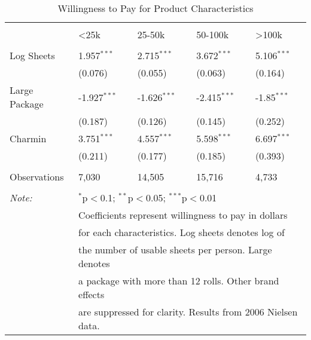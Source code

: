\begin{table}[!htbp] \centering
  \caption{Willingness to Pay for Product Characteristics}
  \label{tab:mlogit2006}
\begin{tabular}{lllll}
\\[-1.8ex]\hline
\hline \\[-1.8ex]
              & \textless{}25k & 25-50k    & 50-100k   & \textgreater{}100k \\
\hline \\[-1.8ex]
Log Sheets    & 1.957$^{***}$       & 2.715$^{***}$  & 3.672$^{***}$  & 5.106$^{***}$           \\
              & (0.076)        & (0.055)   & (0.063)   & (0.164)            \\
Large Package & -1.927$^{***}$      & -1.626$^{***}$ & -2.415$^{***}$ & -1.85$^{***}$           \\
              & (0.187)        & (0.126)   & (0.145)   & (0.252)            \\
Charmin       & 3.751$^{***}$       & 4.557$^{***}$  & 5.598$^{***}$  & 6.697$^{***}$           \\
              & (0.211)        & (0.177)   & (0.185)   & (0.393)            \\
 \hline \\[-1.8ex]
Observations  & 7,030          & 14,505    & 15,716    & 4,733 \\
\hline
\hline \\[-1.8ex]
\textit{Note:}  & \multicolumn{4}{l}{$^{*}$p$<$0.1; $^{**}$p$<$0.05; $^{***}$p$<$0.01} \\
 & \multicolumn{4}{l}{Coefficients represent willingness to pay in dollars}
 \\
 & \multicolumn{4}{l}{for each characteristics. Log sheets denotes log of }
 \\
 & \multicolumn{4}{l}{the number of usable sheets  per person. Large denotes}
 \\
 & \multicolumn{4}{l}{a package with more than 12 rolls. Other brand effects}
 \\
 & \multicolumn{4}{l}{are suppressed for clarity. Results from 2006 Nielsen data.}
 \\
\end{tabular}
\end{table}
